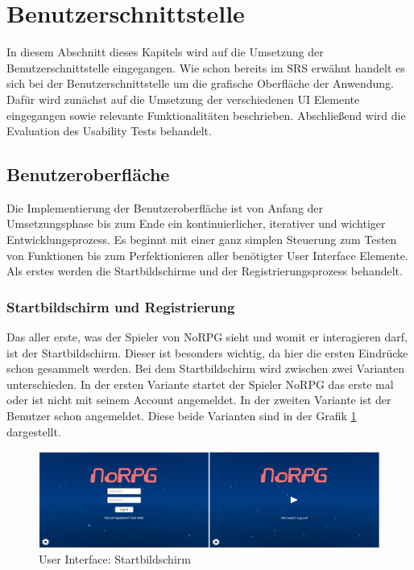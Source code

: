 \section{Benutzerschnittstelle}
	In diesem Abschnitt dieses Kapitels wird auf die Umsetzung der Benutzerschnittstelle eingegangen. Wie schon bereits im SRS erwähnt handelt es sich bei der Benutzerschnittstelle um die grafische Oberfläche der Anwendung. Dafür wird zunächst auf die Umsetzung der verschiedenen UI Elemente eingegangen sowie relevante Funktionalitäten beschrieben. Abschließend wird die Evaluation des Usability Tests behandelt. 
		
	\subsection{Benutzeroberfläche}	
		Die Implementierung der Benutzeroberfläche ist von Anfang der Umsetzungsphase bis zum Ende ein kontinuierlicher, iterativer und wichtiger Entwicklungsprozess. Es beginnt mit einer ganz simplen Steuerung zum Testen von Funktionen bis zum Perfektionieren aller benötigter User Interface Elemente. Als erstes werden die Startbildschirme und der Registrierungsprozess behandelt. 
		
		\subsubsection{Startbildschirm und Registrierung}
			Das aller erste, was der Spieler von NoRPG sieht und womit er interagieren darf, ist der Startbildschirm. Dieser ist besonders wichtig, da hier die ersten Eindrücke schon gesammelt werden. Bei dem Startbildschirm wird zwischen zwei Varianten unterschieden. In der ersten Variante startet der Spieler NoRPG das erste mal oder ist nicht mit seinem Account angemeldet. In der zweiten Variante ist der Benutzer schon angemeldet. Diese beide Varianten sind in der Grafik \ref{startScreenUI} dargestellt.
			
			\begin{figure}[htbp]
				\centering 
				\label{startScreenUI}
				\includegraphics[width=\textwidth]{pics/startbildschirmeScreen.png}
				\caption{User Interface: Startbildschirm}
			\end{figure}
			
